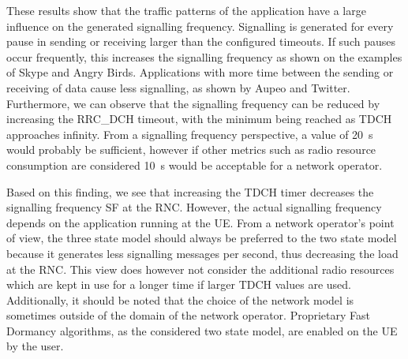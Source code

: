 These results show that the traffic patterns of the application have a large influence on the generated signalling frequency.
Signalling is generated for every pause in sending or receiving larger than the configured timeouts.
If such pauses occur frequently, this increases the signalling frequency as shown on the examples of Skype and Angry Birds.
Applications with more time between the sending or receiving of data cause less signalling, as shown by Aupeo and Twitter.
Furthermore, we can observe that the signalling frequency can be reduced by increasing the \gls{RRC_DCH} timeout, with the minimum being reached as \gls{TDCH} approaches infinity.
From a signalling frequency perspective, a value of \SI{20}{\second} would probably be sufficient, however if other metrics such as radio resource consumption are considered \SI{10}{\second} would be acceptable for a network operator.

Based on this finding, we see that increasing the \gls{TDCH} timer decreases the signalling frequency \gls{SF} at the \gls{RNC}.
However, the actual signalling frequency depends on the application running at the \gls{UE}.
From a network operator's point of view, the three state model should always be preferred to the two state model because it generates less signalling messages per second, thus decreasing the load at the \gls{RNC}.
This view does however not consider the additional radio resources which are kept in use for a longer time if larger \gls{TDCH} values are used.
Additionally, it should be noted that the choice of the network model is sometimes outside of the domain of the network operator.
Proprietary Fast Dormancy algorithms, as the considered two state model, are enabled on the \gls{UE} by the user.

